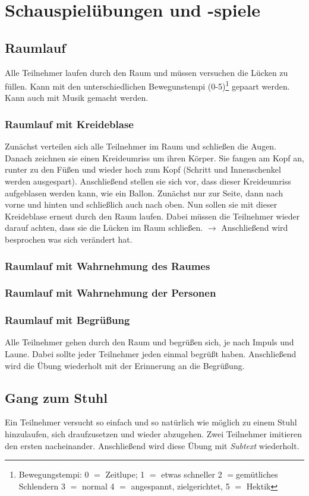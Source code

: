 \documentclass[ngerman, a4paper, twoside]{scrbook}%
\begin{document}
	\chapter{Schauspielübungen und -spiele}

	\section{Raumlauf}
	Alle Teilnehmer laufen durch den Raum und müssen versuchen die Lücken zu füllen. Kann mit den unterschiedlichen Bewegunstempi (0-5)\footnote{Bewegungstempi: 0 $=$ Zeitlupe; 1 $=$ etwas schneller 2 $=$gemütliches Schlendern 3 $=$ normal 4 $=$ angespannt, zielgerichtet, 5 $=$ Hektik}  gepaart werden. Kann auch mit Musik gemacht werden.
	\subsection{Raumlauf mit Kreideblase}
	Zunächst verteilen sich alle Teilnehmer im Raum und schließen die Augen. Danach zeichnen sie einen Kreideumriss um ihren Körper. Sie fangen am Kopf an, runter zu den Füßen und wieder hoch zum Kopf (Schritt und Innenschenkel werden ausgespart). Anschließend stellen sie sich vor, dass dieser Kreideumriss aufgeblasen werden kann, wie ein Ballon. Zunächst nur zur Seite, dann nach vorne und hinten und schließlich auch nach oben. Nun sollen sie mit dieser Kreideblase erneut durch den Raum laufen. Dabei müssen die Teilnehmer wieder darauf achten, dass sie die Lücken im Raum schließen. $\rightarrow$ Anschließend wird besprochen was sich verändert hat.
	\subsection{Raumlauf mit Wahrnehmung des Raumes}
	\subsection{Raumlauf mit Wahrnehmung der Personen}
	\subsection{Raumlauf mit Begrüßung}
	Alle Teilnehmer gehen durch den Raum und begrüßen sich, je nach Impuls und Laune. Dabei sollte jeder Teilnehmer jeden einmal begrüßt haben. Anschließend wird die Übung wiederholt mit der Erinnerung an die Begrüßung.
	\section{Gang zum Stuhl}
	Ein Teilnehmer versucht so einfach und so natürlich wie möglich zu einem Stuhl hinzulaufen, sich draufzusetzen und wieder abzugehen. Zwei Teilnehmer imitieren den ersten nacheinander. Anschließend wird diese Übung mit \emph{Subtext} wiederholt.
\end{document}
